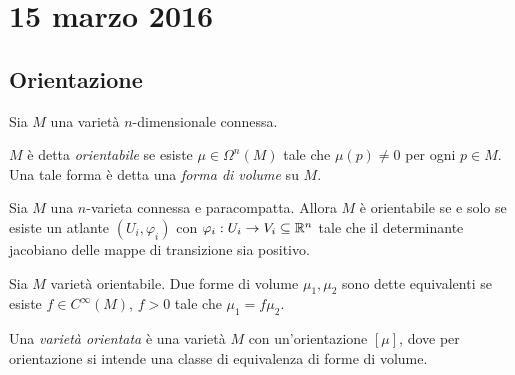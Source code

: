 \chapter{15 marzo 2016}




\section{Orientazione}

Sia $M$ una varietà $n$-dimensionale connessa.

\begin{definition}
	$M$ è detta \emph{orientabile} se esiste $\mu\in\Omega^n(M)$ tale che $\mu(p)\not=0$ per ogni $p\in M$. Una tale forma è detta una \emph{forma di volume} su $M$.
\end{definition}

\begin{proposition}
	Sia $M$ una $n$-varieta connessa e paracompatta. Allora $M$ è orientabile se e solo se esiste un atlante $(U_i,\varphi_i)$ con $\varphi_i:U_i\to V_i\subseteq \mathbb R^n$ tale che il determinante jacobiano delle mappe di transizione sia positivo.
\end{proposition}

\begin{definition}
	Sia $M$ varietà orientabile. Due forme di volume $\mu_1,\mu_2$ sono dette equivalenti se esiste $f\in C^\infty(M)$, $f>0$ tale che $\mu_1= f \mu_2$.
	
	Una \emph{varietà orientata} è una varietà $M$ con un'orientazione $[\mu]$, dove per orientazione si intende una classe di equivalenza di forme di volume.
\end{definition}

